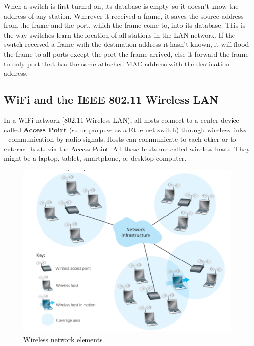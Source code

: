 \documentclass[a4paper, 11pt]{article}
\begin{document}
When a switch is first turned on, its database is empty, so it doesn't know the address of any station. Wherever it received a frame, it saves the source address from the frame and the port, which the frame come to, into its database. This is the way switches learn the location of all stations in the LAN network. If the switch received a frame with the destination address it hasn't known, it will flood the frame to all ports except the port the frame arrived, else it forward the frame to only port that has the same attached MAC address with the destination address.\\

\subsection{WiFi and the IEEE 802.11 Wireless LAN}

In a WiFi network (802.11 Wireless LAN), all hosts connect to a center device called \textbf{Access Point} (same purpose as a Ethernet switch) through wireless links - communication by radio signals. Hosts can communicate to each other or to external hosts via the Access Point. All these hosts are called wireless hosts. They might be a laptop, tablet, smartphone, or desktop computer.\\

\begin{figure}[h]
\includegraphics[scale=0.6]{wireless-network.png}
\caption{Wireless network elements}
\label{fig:wireless-network}
\end{figure}
\end{document}

